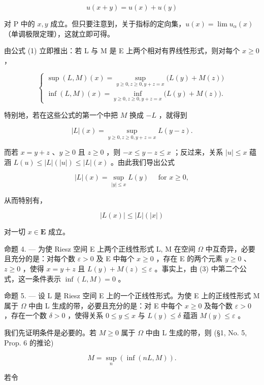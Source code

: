 \[
u (x + y) = u (x) + u (y)
\]

对 P 中的 \(x, y\) 成立。但只要注意到，关于指标的定向集，\(u(x) = \lim u_{\alpha}(x)\) （单调极限定理），这就立即可得。

由公式 (1) 立即推出：若 L 与 M 是 E 上两个相对有界线性形式，则对每个 \(x \geqslant 0\) ，

\[
\left\{ \begin{array}{l} \sup (L, M) (x) = \sup _ {y \geqslant 0,   z \geqslant 0,   y + z = x} \big (L (y) + M (z) \big) \\ \inf (L, M) (x) = \inf _ {y \geqslant 0,   z \geqslant 0,   y + z = x} \big (L (y) + M (z) \big). \end{array} \right.\tag{3}
\]

特别地，若在这些公式的第一个中把 \(M\) 换成 \(-L\) ，就得到

\[
| L | (x) = \sup _ {y \geqslant 0, z \geqslant 0, y + z = x} L (y - z).
\]

而若 \(x = y + z\) 、\(y \geqslant 0\) 且 \(z \geqslant 0\) ，则 \(-x \leqslant y - z \leqslant x\) ；反过来，关系 \(|u| \leqslant x\) 蕴涵 \(L(u) \leqslant |L|(|u|) \leqslant |L|(x)\) 。由此我们导出公式

\[
| L | (x) = \sup _ {| y | \leqslant x} L (y) \quad \text { for } x \geqslant 0,\tag{4}
\]

从而特别有，

\[
| L (x) | \leqslant | L | (| x |)\tag{5}
\]

对一切 \(x \in \mathbf{E}\) 成立。

命题 4. --- 为使 Riesz 空间 E 上两个正线性形式 L, M 在空间 \(\Omega\) 中互奇异，必要且充分的是：对每个数 \(\varepsilon > 0\) 及 E 中每个 \(x \geqslant 0\) ，存在 E 的两个元素 \(y \geqslant 0\) 、\(z \geqslant 0\) ，使得 \(x = y + z\) 且 \(L(y) + M(z) \leqslant \varepsilon\) 。事实上，由 (3) 中第二个公式，这一条件表示 \(\inf(L, M) = 0\) 。

命题 5. --- 设 L 是 Riesz 空间 E 上的一个正线性形式。为使 E 上的正线性形式 M 属于 \(\Omega\) 中由 L 生成的带，必要且充分的是：对 E 中每个 \(x \geqslant 0\) 及每个数 \(\varepsilon > 0\) ，存在一个数 \(\delta > 0\) ，使得关系 \(0 \leqslant y \leqslant x\) 与 \(L(y) \leqslant \delta\) 蕴涵 \(M(y) \leqslant \varepsilon\) 。

我们先证明条件是必要的。若 \(M \geqslant 0\) 属于 \(\Omega\) 中由 L 生成的带，则 (§1, No. 5, Prop. 6 的推论)

\[
M = \sup _ {n} \left(\inf (n L, M)\right).
\]

若令

